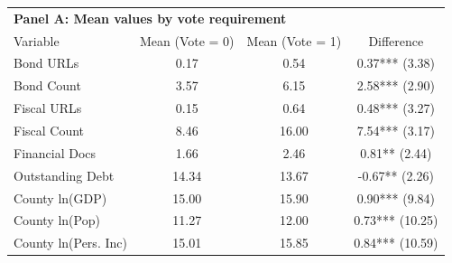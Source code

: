 \begin{table}[ht]
\centering
\begin{tabular*}{\textwidth}{@{\extracolsep{\fill}}lccc}
\multicolumn{4}{l}{\textbf{Panel A: Mean values by vote requirement}}\\

\addlinespace
  \hline
Variable & Mean (Vote = 0) & Mean (Vote = 1) & Difference \\ 
  \hline
Bond URLs & 0.17 & 0.54 & 0.37*** (3.38) \\ 
  Bond Count & 3.57 & 6.15 & 2.58*** (2.90) \\ 
  Fiscal URLs & 0.15 & 0.64 & 0.48*** (3.27) \\ 
  Fiscal Count & 8.46 & 16.00 & 7.54*** (3.17) \\ 
  Financial Docs & 1.66 & 2.46 & 0.81** (2.44) \\ 
  Outstanding Debt & 14.34 & 13.67 & -0.67** (2.26) \\ 
  County ln(GDP) & 15.00 & 15.90 & 0.90*** (9.84) \\ 
  County ln(Pop) & 11.27 & 12.00 & 0.73*** (10.25) \\ 
  County ln(Pers. Inc) & 15.01 & 15.85 & 0.84*** (10.59) \\ 
   \hline
\end{tabular*}
\end{table}
